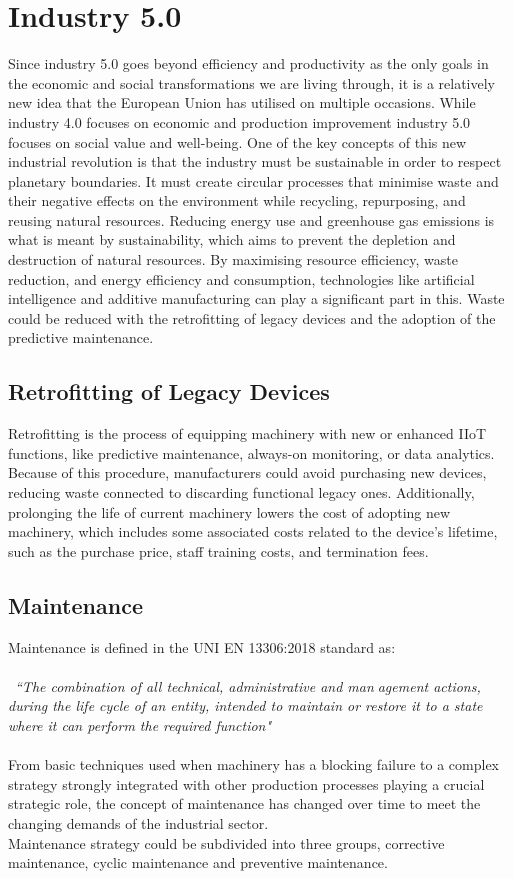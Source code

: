 \section{Industry 5.0}
Since industry 5.0 goes beyond efficiency and productivity as the only goals in the economic and social transformations we are living through, it is a relatively new idea that the European Union has utilised on multiple occasions. While industry 4.0 focuses on economic and production improvement industry 5.0 focuses on social value and well-being. One of the key concepts of this new industrial revolution is that the industry must be sustainable in order to respect planetary boundaries. It must create circular processes that minimise waste and their negative effects on the environment while recycling, repurposing, and reusing natural resources. Reducing energy use and greenhouse gas emissions is what is meant by sustainability, which aims to prevent the depletion and destruction of natural resources. By maximising resource efficiency, waste reduction, and energy efficiency and consumption, technologies like artificial intelligence and additive manufacturing can play a significant part in this. Waste could be reduced with the retrofitting of legacy devices and the adoption of the predictive maintenance.
\subsection{Retrofitting of Legacy Devices}
Retrofitting is the process of equipping machinery with new or enhanced IIoT functions, like predictive maintenance, always-on monitoring, or data analytics. Because of this procedure, manufacturers could avoid purchasing new devices, reducing waste connected to discarding functional legacy ones. Additionally, prolonging the life of current machinery lowers the cost of adopting new machinery, which includes some associated costs related to the device's lifetime, such as the purchase price, staff training costs, and termination fees. 
\subsection{Maintenance}
Maintenance is defined in the UNI EN 13306:2018 standard as:
\\\\\
	\emph{``The combination of all technical, administrative and management actions, during the life cycle of an entity, intended to maintain or restore it to a state where it can perform the required function"}
\\\\
From basic techniques used when machinery has a blocking failure to a complex strategy strongly integrated with other production processes playing a crucial strategic role, the concept of maintenance has changed over time to meet the changing demands of the industrial sector.\\
Maintenance strategy could be subdivided into three groups, corrective maintenance, cyclic maintenance and preventive maintenance.
